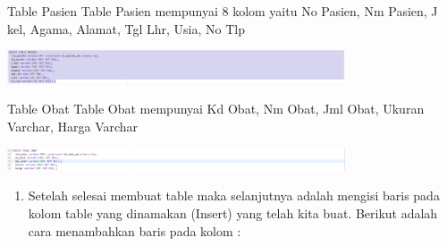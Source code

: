 \documentclass{article}
\begin{document}
{Table Pasien}
Table Pasien mempunyai 8 kolom yaitu No Pasien, Nm Pasien, J kel, Agama, Alamat, Tgl Lhr, Usia, No Tlp
\begin{center}
    \includegraphics[width=10cm]{figure/pasien.PNG}
\end{center}
{Table Obat}
Table Obat mempunyai Kd Obat, Nm Obat, Jml Obat, Ukuran Varchar, Harga Varchar
\begin{center}
    \includegraphics[width=10cm]{figure/obat.PNG}
\end{center}
\newpage \begin{enumerate}
    \item Setelah selesai membuat table maka selanjutnya adalah mengisi baris pada kolom table yang dinamakan (Insert) yang telah kita buat. Berikut adalah cara menambahkan baris pada kolom :
    

\end{enumerate}
\end{document}
